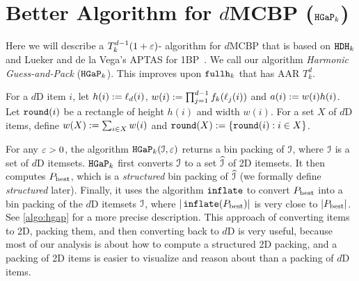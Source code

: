 \section{Better Algorithm for \texorpdfstring{$d$}{d}MCBP (\texorpdfstring{$\operatorname{\mathtt{HGaP}}_{k}$}{HGaP})}
\label{sec:hgap}

Here we will describe a $T_k^{d-1}(1+\varepsilon)$-\asymAppx{} algorithm for $d$MCBP that is based on
$\operatorname{\mathtt{HDH}}_{k}$ and Lueker and de la Vega's APTAS for 1BP~\cite{bp-aptas}.
We call our algorithm \emph{Harmonic Guess-and-Pack} ($\operatorname{\mathtt{HGaP}}_{k}$).
This improves upon $\operatorname{\mathtt{fullh}}_{k}$ that has AAR $T_k^d$.

\begin{comment}
In \cite{caprara2008}, Caprara showed that we can get a $T_k^{d-1}(1+\eps)$-approx
algorithm for $d$BP by using $\hdhksp$ to pack the items into shelves
and then packing the shelves into bins using the APTAS for 1BP.
$\hgapk$ works the other way around, i.e., we first guess
the heights of the shelves and the way they are packed into bins,
and then we compute an assortment of the input that can be packed into the shelves.
\end{comment}

\begin{definition}
For a $d$D item $i$, let $h(i) := \ell_d(i)$,
$w(i) := \prod_{j=1}^{d-1} f_k(\ell_j(i))$ and $a(i) := w(i)h(i)$.
Let $\operatorname{\mathtt{round}}(i)$ be a rectangle of height $h(i)$ and width $w(i)$.
For a set $X$ of $d$D items, define $w(X) := \sum_{i \in X} w(i)$
and $\operatorname{\mathtt{round}}(X) := \{\operatorname{\mathtt{round}}(i): i \in X\}$.
\end{definition}

For any $\varepsilon > 0$, the algorithm $\operatorname{\mathtt{HGaP}}_{k}(\mathcal{I}, \varepsilon)$ returns
a bin packing of $\mathcal{I}$, where $\mathcal{I}$ is a set of $d$D itemsets.
$\operatorname{\mathtt{HGaP}}_{k}$ first converts $\mathcal{I}$ to a set $\widehat{\mathcal{I}}$ of 2D itemsets.
It then computes $P_{\mathrm{best}}$, which is a \emph{structured} bin packing of $\widehat{\mathcal{I}}$
(we formally define \emph{structured} later).
Finally, it uses the algorithm $\operatorname{\mathtt{inflate}}$ to convert $P_{\mathrm{best}}$
into a bin packing of the $d$D itemsets $\mathcal{I}$, where
$|\operatorname{\mathtt{inflate}}(P_{\mathrm{best}})|$ is very close to $|P_{\mathrm{best}}|$.
See \cref{algo:hgap} for a more precise description.
This approach of converting items to 2D, packing them,
and then converting back to $d$D is very useful,
because most of our analysis is about how to compute a structured 2D packing, and
a packing of 2D items is easier to visualize and reason about than a packing of $d$D items.

